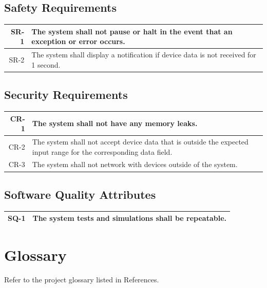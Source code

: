 \documentclass[12pt,oneside,letterpaper]{article}
\begin{document}
\subsection{Safety Requirements}
\begin{longtable}{|r|p{3.8in}|}
\hline
SR-1 & The system shall not pause or halt in the event that an exception or error occurs. \\
\hline
SR-2 & The system shall display a notification if device data is not received for 1 second. \\
\hline
\end{longtable}

\subsection{Security Requirements}
\begin{longtable}{|r|p{3.8in}|}
\hline
CR-1 & The system shall not have any memory leaks. \\
\hline
CR-2 & The system shall not accept device data that is outside the expected input range for the corresponding data field. \\
\hline
CR-3 & The system shall not network with devices outside of the system. \\
\hline
\end{longtable}

\subsection{Software Quality Attributes}
\begin{longtable} {|r|p{3.8in}|}
\hline
SQ-1 & The system tests and simulations shall be repeatable. \\
\hline
\end{longtable}

\appendix

\section{Glossary}
Refer to the project glossary listed in References.
\end{document}

